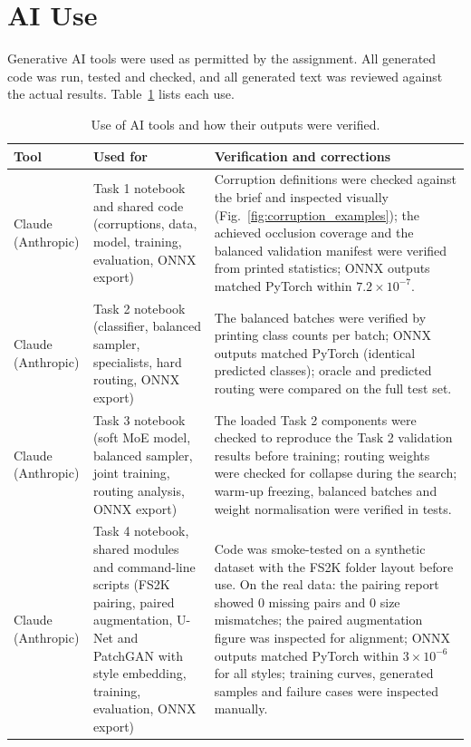 \documentclass[conference]{IEEEtran}
\begin{document}
\section{AI Use}
\label{app:ai}
Generative AI tools were used as permitted by the assignment. All generated code was run, tested and checked, and all generated text was reviewed against the actual results. Table~\ref{tab:ai_use} lists each use.

\begin{table}[t]
\centering
\caption{Use of AI tools and how their outputs were verified.}
\label{tab:ai_use}
\footnotesize
\begin{tabular}{@{}p{2.2cm}p{5.2cm}p{8.8cm}@{}}
\toprule
Tool & Used for & Verification and corrections \\
\midrule
Claude (Anthropic) & Task 1 notebook and shared code (corruptions, data, model, training, evaluation, ONNX export) & Corruption definitions were checked against the brief and inspected visually (Fig.~\ref{fig:corruption_examples}); the achieved occlusion coverage and the balanced validation manifest were verified from printed statistics; ONNX outputs matched PyTorch within $7.2\times10^{-7}$. \\
Claude (Anthropic) & Task 2 notebook (classifier, balanced sampler, specialists, hard routing, ONNX export) & The balanced batches were verified by printing class counts per batch; ONNX outputs matched PyTorch (identical predicted classes); oracle and predicted routing were compared on the full test set. \\
Claude (Anthropic) & Task 3 notebook (soft MoE model, balanced sampler, joint training, routing analysis, ONNX export) & The loaded Task 2 components were checked to reproduce the Task 2 validation results before training; routing weights were checked for collapse during the search; warm-up freezing, balanced batches and weight normalisation were verified in tests. \\
Claude (Anthropic) & Task 4 notebook, shared modules and command-line scripts (FS2K pairing, paired augmentation, U-Net and PatchGAN with style embedding, training, evaluation, ONNX export) & Code was smoke-tested on a synthetic dataset with the FS2K folder layout before use. On the real data: the pairing report showed 0 missing pairs and 0 size mismatches; the paired augmentation figure was inspected for alignment; ONNX outputs matched PyTorch within $3\times10^{-6}$ for all styles; training curves, generated samples and failure cases were inspected manually. \\

\end{tabular}
\end{table}
\end{document}
